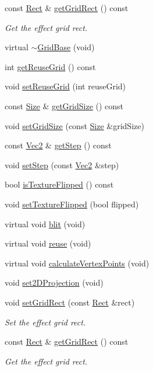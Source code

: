 \begin{DoxyCompactItemize}
const \hyperlink{classRect}{Rect} \& \hyperlink{classGridBase_a7c4baef8d6d3dca82a01c405b5b53d2d}{get\+Grid\+Rect} () const
\begin{DoxyCompactList}\small\item\em Get the effect grid rect. \end{DoxyCompactList}\item 
virtual \hyperlink{classGridBase_a570e43e284b8cdfc261414d6ebb07aa0}{$\sim$\+Grid\+Base} (void)
\item 
int \hyperlink{classGridBase_a9f4b58b73b1986c40f6eee27ed7ddd99}{get\+Reuse\+Grid} () const
\item 
void \hyperlink{classGridBase_ab87f6c1456330846fb903ab560fed507}{set\+Reuse\+Grid} (int reuse\+Grid)
\item 
const \hyperlink{classSize}{Size} \& \hyperlink{classGridBase_a4c9abc11e4535202a109b347c523c637}{get\+Grid\+Size} () const
\item 
void \hyperlink{classGridBase_a1aaace91e60f9322a8782981dcab64b3}{set\+Grid\+Size} (const \hyperlink{classSize}{Size} \&grid\+Size)
\item 
const \hyperlink{classVec2}{Vec2} \& \hyperlink{classGridBase_aff25f0fbdf81662b2b54e37dd2c0023c}{get\+Step} () const
\item 
void \hyperlink{classGridBase_a7d8d0336cded71e9a0874b4fafa4b4c7}{set\+Step} (const \hyperlink{classVec2}{Vec2} \&step)
\item 
bool \hyperlink{classGridBase_a12093e21451d5f4ac1835a9ded33fbd8}{is\+Texture\+Flipped} () const
\item 
void \hyperlink{classGridBase_a056aba2cf7d266d1484fa0196863d1e7}{set\+Texture\+Flipped} (bool flipped)
\item 
virtual void \hyperlink{classGridBase_a269a0e153a09131b8020add699a74166}{blit} (void)
\item 
virtual void \hyperlink{classGridBase_a8c057ea127c1cbbfa63ded2ade58446b}{reuse} (void)
\item 
virtual void \hyperlink{classGridBase_af0a2a35a7ded95f2be589301019717a0}{calculate\+Vertex\+Points} (void)
\item 
void \hyperlink{classGridBase_a424e6c77877c5146b05b10cb1d1c6b00}{set2\+D\+Projection} (void)
\item 
void \hyperlink{classGridBase_a078da34e2b566d89e4364ab19a37311d}{set\+Grid\+Rect} (const \hyperlink{classRect}{Rect} \&rect)
\begin{DoxyCompactList}\small\item\em Set the effect grid rect. \end{DoxyCompactList}\item 
const \hyperlink{classRect}{Rect} \& \hyperlink{classGridBase_a7c4baef8d6d3dca82a01c405b5b53d2d}{get\+Grid\+Rect} () const
\begin{DoxyCompactList}\small\item\em Get the effect grid rect. \end{DoxyCompactList}\end{DoxyCompactItemize}
